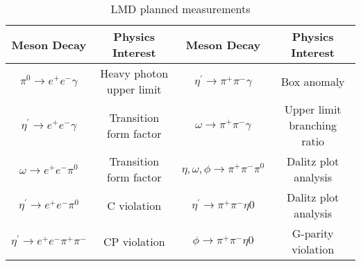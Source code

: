 \begin{table}[h!]
\begin{minipage}{\textwidth}
\begin{center}


\caption{LMD planned measurements \vspace{0.75mm}}

\begin{tabular}{cc||cc}
\hline
Meson Decay & Physics Interest &Meson Decay & Physics Interest \\
\hline
$\pi^0\to e^+e^-\gamma$  & Heavy photon upper limit &$\eta^{\prime}\to \pi^+\pi^-\gamma$  & Box anomaly \\
$\eta^{\prime}\to e^+e^-\gamma$  & Transition form factor &$\omega\to \pi^+\pi^-\gamma$  & Upper limit branching ratio \\
$\omega\to e^+e^-\pi^0$ & Transition form factor & $\eta, \omega, \phi\to \pi^+\pi^-\pi^0$ & Dalitz plot analysis\\
$\eta^{\prime}\to e^+e^-\pi^0$ & C violation & $\eta^{\prime}\to \pi^+\pi^-\eta0$ & Dalitz plot analysis\\
$\eta^{\prime}\to e^+e^-\pi^+\pi^-$  & CP violation & $\phi\to \pi^+\pi^-\eta0$ & G-parity violation\\
\hline 
\end{tabular}


\end{center}
\end{minipage}
\end{table}
\vspace{20pt}